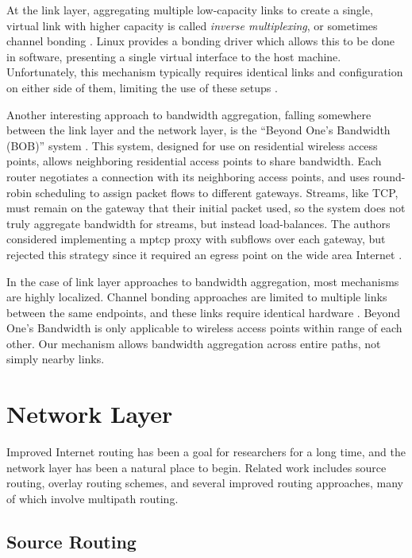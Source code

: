 \documentclass{cwru}
\begin{document}
At the link layer, aggregating multiple low-capacity links to create a single,
virtual link with higher capacity is called \emph{inverse multiplexing}, or
sometimes channel bonding \cite{duncanson1994inverse}. Linux provides a bonding
driver which allows this to be done in software, presenting a single virtual
interface to the host machine. Unfortunately, this mechanism typically requires
identical links and configuration on either side of them, limiting the use of
these setups \cite{chiussi1998generalized}.

Another interesting approach to bandwidth aggregation, falling somewhere between
the link layer and the network layer, is the ``Beyond One's Bandwidth (BOB)''
system \cite{radio-agg}. This system, designed for use on residential wireless
access points, allows neighboring residential access points to share bandwidth.
Each router negotiates a connection with its neighboring access points, and uses
round-robin scheduling to assign packet flows to different gateways. Streams,
like TCP, must remain on the gateway that their initial packet used, so the
system does not truly aggregate bandwidth for streams, but instead
load-balances. The authors considered implementing a \ac{mptcp} proxy with
subflows over each gateway, but rejected this strategy since it required an
egress point on the wide area Internet \cite{radio-agg}.

In the case of link layer approaches to bandwidth aggregation, most mechanisms
are highly localized. Channel bonding approaches are limited to multiple links
between the same endpoints, and these links require identical hardware
\cite{chiussi1998generalized}. Beyond One's Bandwidth is only applicable to
wireless access points within range of each other. Our mechanism allows
bandwidth aggregation across entire paths, not simply nearby links.

\section{Network Layer}

Improved Internet routing has been a goal for researchers for a long time, and
the network layer has been a natural place to begin. Related work includes
source routing, overlay routing schemes, and several improved routing
approaches, many of which involve multipath routing.

\subsection{Source Routing}
\end{document}
